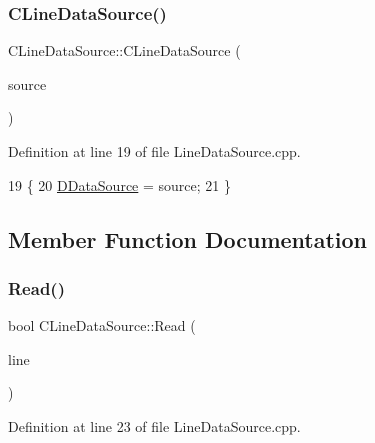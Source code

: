 \subsubsection{\texorpdfstring{C\+Line\+Data\+Source()}{CLineDataSource()}}
{\footnotesize\ttfamily C\+Line\+Data\+Source\+::\+C\+Line\+Data\+Source (\begin{DoxyParamCaption}\item[{std\+::shared\+\_\+ptr$<$ \hyperlink{classCDataSource}{C\+Data\+Source} $>$}]{source }\end{DoxyParamCaption})}



Definition at line 19 of file Line\+Data\+Source.\+cpp.


\begin{DoxyCode}
19                                                                    \{
20     \hyperlink{classCLineDataSource_a976b7e02379cb8b29eb16cfedd1352cb}{DDataSource} = source;
21 \}
\end{DoxyCode}


\subsection{Member Function Documentation}
\hypertarget{classCLineDataSource_a569f5a9732d73ac8813c0ba4860e2e66}{}\label{classCLineDataSource_a569f5a9732d73ac8813c0ba4860e2e66} 
\subsubsection{\texorpdfstring{Read()}{Read()}}
{\footnotesize\ttfamily bool C\+Line\+Data\+Source\+::\+Read (\begin{DoxyParamCaption}\item[{std\+::string \&}]{line }\end{DoxyParamCaption})}



Definition at line 23 of file Line\+Data\+Source.\+cpp.


